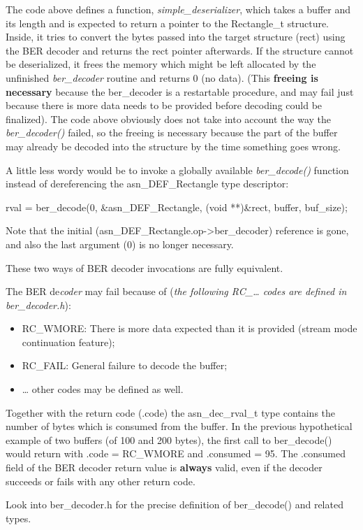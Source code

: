 \documentclass[english,oneside,12pt]{book}
\begin{document}
The code above defines a function, \emph{simple\_deserializer}, which
takes a buffer and its length and is expected to return a pointer
to the Rectangle\_t structure. Inside, it tries to convert the bytes
passed into the target structure (rect) using the BER decoder and
returns the rect pointer afterwards. If the structure cannot be deserialized,
it frees the memory which might be left allocated by the unfinished
\emph{ber\_decoder} routine and returns 0 (no data). (This \textbf{freeing
is necessary} because the ber\_decoder is a restartable procedure,
and may fail just because there is more data needs to be provided
before decoding could be finalized). The code above obviously does
not take into account the way the \emph{ber\_decoder()} failed, so
the freeing is necessary because the part of the buffer may already
be decoded into the structure by the time something goes wrong.

A little less wordy would be to invoke a globally available \emph{ber\_decode()}
function instead of dereferencing the asn\_DEF\_Rectangle type descriptor:
\begin{codesample}
rval = ber_decode(0, &asn_DEF_Rectangle, (void **)&rect, buffer, buf_size);
\end{codesample}
Note that the initial (asn\_DEF\_Rectangle.op->ber\_decoder) reference
is gone, and also the last argument (0) is no longer necessary.

These two ways of BER decoder invocations are fully equivalent.

The BER de\emph{coder} may fail because of (\emph{the following RC\_\ldots{}
codes are defined in ber\_decoder.h}):
\begin{itemize}
\item RC\_WMORE: There is more data expected than it is provided (stream
mode continuation feature);
\item RC\_FAIL: General failure to decode the buffer;
\item \ldots{} other codes may be defined as well.
\end{itemize}
Together with the return code (.code) the asn\_dec\_rval\_t type contains
the number of bytes which is consumed from the buffer. In the previous
hypothetical example of two buffers (of 100 and 200 bytes), the first
call to ber\_decode() would return with .code = RC\_WMORE and .consumed
= 95. The .consumed field of the BER decoder return value is \textbf{always}
valid, even if the decoder succeeds or fails with any other return
code.

Look into ber\_decoder.h for the precise definition of ber\_decode()
and related types.
\end{document}
